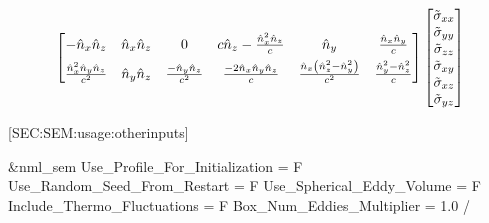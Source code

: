 \begin{itemize}[parsep=2.5\parsep]
\begin{equation*}
\begin{bmatrix}
        -\hat{n}_x\hat{n}_z &
        \hat{n}_x\hat{n}_z &
        0 &
        c\hat{n}_z-\frac{\hat{n}_x^2\hat{n}_z}{c} &
        \hat{n}_y &
        \frac{\hat{n}_x\hat{n}_y}{c} \\[1.0ex]
        \frac{\hat{n}_x^2\hat{n}_y\hat{n}_z}{c^2} &
        \hat{n}_y\hat{n}_z &
        \frac{-\hat{n}_y\hat{n}_z}{c^2} &
        \frac{-2\hat{n}_x\hat{n}_y\hat{n}_z}{c} &
        \frac{\hat{n}_x\left(\hat{n}_z^2-\hat{n}_y^2\right)} {c^2} &
        \frac{\hat{n}_y^2-\hat{n}_z^2}{c}
      \end{bmatrix}
      \begin{bmatrix}
        \tilde{\sigma}_{xx}\\ \tilde{\sigma}_{yy}\\ \tilde{\sigma}_{zz}\\
        \tilde{\sigma}_{xy}\\ \tilde{\sigma}_{xz}\\ \tilde{\sigma}_{yz}
      \end{bmatrix}
    \end{equation*}


\end{itemize}


%
[SEC:SEM:usage:otherinputs]

\begin{nmldescitem}
&nml_sem
  Use_Profile_For_Initialization = F
  Use_Random_Seed_From_Restart   = F
  Use_Spherical_Eddy_Volume      = F
  Include_Thermo_Fluctuations    = F
  Box_Num_Eddies_Multiplier      = 1.0
/
\end{nmldescitem}

